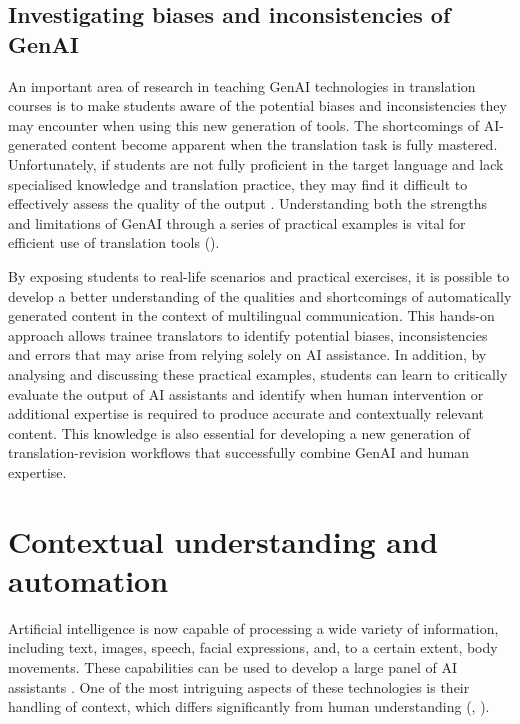 \documentclass[output=paper]{langscibook}
\begin{document}
\subsection{Investigating biases and inconsistencies of GenAI}
An important area of research in teaching GenAI technologies in translation courses is to make students aware of the potential biases and inconsistencies they may encounter when using this new generation of tools. The shortcomings of AI-generated content become apparent when the translation task is fully mastered. Unfortunately, if students are not fully proficient in the target language and lack specialised knowledge and translation practice, they may find it difficult to effectively assess the quality of the output \citep{tavarestor23}. Understanding both the strengths and limitations of GenAI through a series of practical examples is vital for efficient use of translation tools (\citealt{farrell2023_eval}).

By exposing students to real-life scenarios and practical exercises, it is possible to develop a better understanding of the qualities and shortcomings of automatically generated content in the context of multilingual communication. This hands-on approach allows trainee translators to identify potential biases, inconsistencies and errors that may arise from relying solely on AI assistance. In addition, by analysing and discussing these practical examples, students can learn to critically evaluate the output of AI assistants and identify when human intervention or additional expertise is required to produce accurate and contextually relevant content. This knowledge is also essential for developing a new generation of translation-revision workflows that successfully combine GenAI and human expertise.

\section{Contextual understanding and automation}\label{sec:8:2}
Artificial intelligence is now capable of processing a wide variety of information, including text, images, speech, facial expressions, and, to a certain extent, body movements. These capabilities can be used to develop a large panel of AI assistants \citep{yang2024m3pmultimodalmultilingualtranslation}. One of the most intriguing aspects of these technologies is their handling of context, which differs significantly from human understanding (\citealt{obrien_human-centered_2024}, \citealt{zhu2024largelanguagemodelsunderstand}).
\end{document}
